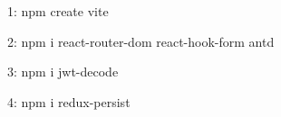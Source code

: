1: npm create vite

2: npm i react-router-dom react-hook-form antd

3: npm i jwt-decode

4: npm i redux-persist